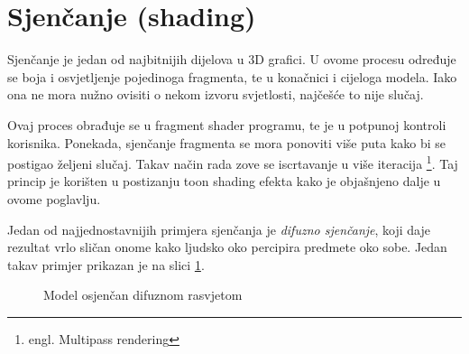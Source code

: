 \section{Sjenčanje (shading)}
\label{sec:shading}

Sjenčanje je jedan od najbitnijih dijelova u 3D grafici. U ovome procesu određuje se boja i osvjetljenje pojedinoga fragmenta, te u konačnici i cijeloga modela. Iako ona ne mora nužno ovisiti o nekom izvoru svjetlosti, najčešće to nije slučaj.

Ovaj proces obrađuje se u fragment shader programu, te je u potpunoj kontroli korisnika. Ponekada, sjenčanje fragmenta se mora ponoviti više puta kako bi se postigao željeni slučaj. Takav način rada zove se iscrtavanje u više iteracija \footnote{engl. Multipass rendering}. Taj princip je korišten u postizanju toon shading efekta kako je objašnjeno dalje u ovome poglavlju.

Jedan od najjednostavnijih primjera sjenčanja je \emph{difuzno sjenčanje}, koji daje rezultat vrlo sličan onome kako ljudsko oko percipira predmete oko sobe. Jedan takav primjer prikazan je na slici \ref{fig:monkey-plastic}.


\begin{figure}[H]
\centering{}
\caption{Model osjenčan difuznom rasvjetom}
\label{fig:monkey-plastic}
\end{figure}

